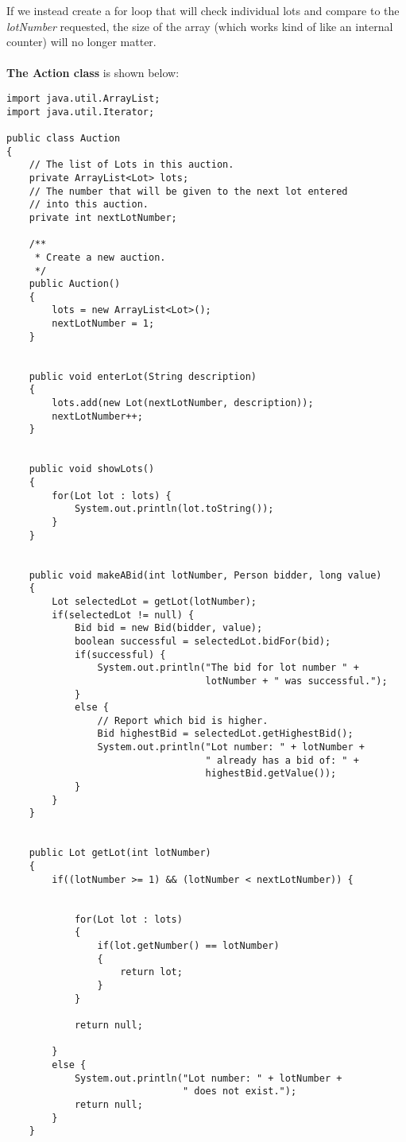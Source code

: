 \documentclass[10pt,a4paper]{article}
\begin{document}
If we instead create a for loop that will check individual lots and compare to the \textit{lotNumber} requested, the size of the array (which works kind of like an internal counter) will no longer matter.
\\
\\
\textbf{The Action class} is shown below:
\begin{lstlisting}
import java.util.ArrayList;
import java.util.Iterator;

public class Auction
{
    // The list of Lots in this auction.
    private ArrayList<Lot> lots;
    // The number that will be given to the next lot entered
    // into this auction.
    private int nextLotNumber;

    /**
     * Create a new auction.
     */
    public Auction()
    {
        lots = new ArrayList<Lot>();
        nextLotNumber = 1;
    }


    public void enterLot(String description)
    {
        lots.add(new Lot(nextLotNumber, description));
        nextLotNumber++;
    }


    public void showLots()
    {
        for(Lot lot : lots) {
            System.out.println(lot.toString());
        }
    }
    

    public void makeABid(int lotNumber, Person bidder, long value)
    {
        Lot selectedLot = getLot(lotNumber);
        if(selectedLot != null) {
            Bid bid = new Bid(bidder, value);
            boolean successful = selectedLot.bidFor(bid);
            if(successful) {
                System.out.println("The bid for lot number " +
                                   lotNumber + " was successful.");
            }
            else {
                // Report which bid is higher.
                Bid highestBid = selectedLot.getHighestBid();
                System.out.println("Lot number: " + lotNumber +
                                   " already has a bid of: " +
                                   highestBid.getValue());
            }
        }
    }


    public Lot getLot(int lotNumber)
    {
        if((lotNumber >= 1) && (lotNumber < nextLotNumber)) {
            
            
            for(Lot lot : lots)
            {
                if(lot.getNumber() == lotNumber)
                {
                    return lot;
                }
            }
            
            return null;
            
        }
        else {
            System.out.println("Lot number: " + lotNumber +
                               " does not exist.");
            return null;
        }
    }
    

\end{lstlisting}
\end{document}
